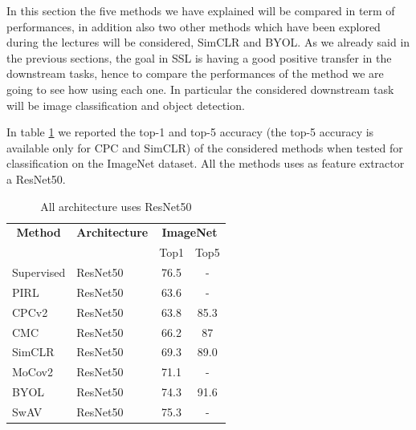 In this section the five methods we have explained will be compared in term of performances, in addition also two other methods which have been explored during the lectures will be considered, SimCLR and BYOL. As we already said in the previous sections, the goal in SSL is having a good positive transfer in the downstream tasks, hence to compare the performances of the method we are going to see how using each one. In particular the considered downstream task will be image classification and object detection.

In table \ref{tab:imagenet-top1-5-acc-comp} we reported the top-1 and top-5 accuracy (the top-5 accuracy is available only for CPC and SimCLR) of the considered methods when tested for classification on the ImageNet dataset. All the methods uses as feature extractor a ResNet50.

\begin{table}[H]
	\centering
	\begin{tabular}{|l|l|cc|}
		\hline
		\multicolumn{1}{|c|}{\textbf{Method}} & \textbf{Architecture} & \multicolumn{2}{c|}{\textbf{ImageNet}} \\
		\multicolumn{1}{|c|}{} &  & Top1 & Top5 \\
		\hline
		Supervised & ResNet50 & 76.5 & - \\
		PIRL & ResNet50 & 63.6 & - \\
		CPCv2 & ResNet50 & 63.8 & 85.3 \\
		CMC & ResNet50  & 66.2 & 87 \\
		SimCLR & ResNet50 & 69.3 & 89.0 \\
		MoCov2 & ResNet50 & 71.1 & - \\
		BYOL & ResNet50  & 74.3 & 91.6 \\ 
		SwAV & ResNet50 & 75.3 & - \\
		\hline
\end{tabular}
	\caption{All architecture uses ResNet50}
	\label{tab:imagenet-top1-5-acc-comp}
\end{table}


